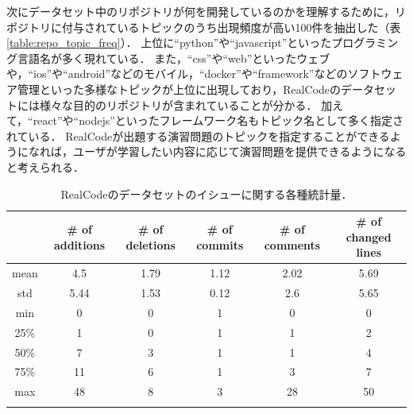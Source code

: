 次にデータセット中のリポジトリが何を開発しているのかを理解するために，リポジトリに付与されているトピックのうち出現頻度が高い100件を抽出した（表\ref{table:repo_topic_freq}）．
上位に``python''や``javascript''といったプログラミング言語名が多く現れている．
また，``css''や``web''といったウェブや，``ios''や``android''などのモバイル，``docker''や``framework''などのソフトウェア管理といった多様なトピックが上位に出現しており，RealCodeのデータセットには様々な目的のリポジトリが含まれていることが分かる．
加えて，``react''や``nodejs''といったフレームワーク名もトピック名として多く指定されている．
RealCodeが出題する演習問題のトピックを指定することができるようになれば，ユーザが学習したい内容に応じて演習問題を提供できるようになると考えられる．

\begin{table}[!b]
 \small
  \centering
  \caption{RealCodeのデータセットのイシューに関する各種統計量．}
  \label{table:stats_issues}
  \begin{tabular}{c || c | c | c | c | c } \Xhline{3\arrayrulewidth}
        & \# of additions & \# of deletions & \# of commits & \# of comments & \# of changed lines \\ \hline \hline
        mean & 4.5 & 1.79 & 1.12 & 2.02 & 5.69 \\
        std & 5.44 & 1.53 & 0.12 & 2.6 & 5.65 \\
        min & 0 & 0 & 1 & 0 & 0 \\
        25\% & 1 & 0 & 1 & 1 & 2 \\
        50\% & 7 & 3 & 1 & 1 & 4 \\
        75\% & 11 & 6 & 1 & 3 & 7 \\
        max & 48 & 8 & 3 & 28 & 50 \\
    \Xhline{3\arrayrulewidth}
\end{tabular}
\end{table}

